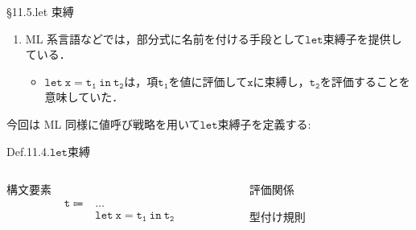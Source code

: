 \documentclass[9pt]{beamer}
\begin{document}
\begin{frame}{\S11.5.let 束縛}
\begin{enumerate}
\item ML 系言語などでは，部分式に名前を付ける手段として$\mathtt{let}$束縛子を提供している．\begin{itemize}
\item $\mathtt{let\ x = t_{1}\ in\ t_{2}}$は，項$\mathtt{t_{1}}$を値に評価して$\mathtt{x}$に束縛し，$\mathtt{t_{2}}$を評価することを意味していた．
\end{itemize}\end{enumerate}
今回は ML 同様に値呼び戦略を用いて$\mathtt{let}$束縛子を定義する:
\begin{alertblock}{Def.11.4.$\mathtt{let}$束縛}
    \begin{columns}
    \begin{column}{0.3\columnwidth}
        構文要素
        \begin{align*}
        \mathtt{t}\Coloneq&\ldots\\
            &\mathtt{let\ x = t_{1}\ in\ t_{2}}
        \end{align*}
    \end{column}
    \begin{column}{0.65\columnwidth}
        評価関係
        \begin{prooftree}
            \end{prooftree}
            \begin{prooftree}
                \end{prooftree}
        型付け規則
        \begin{prooftree}
        \end{prooftree}
    \end{column}
    \end{columns}
\end{alertblock}
\end{frame}
\end{document}
